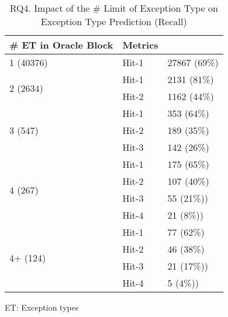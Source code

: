 \begin{table}[t]
	\caption{RQ4. Impact of the \# Limit of Exception Type on Exception Type Prediction (Recall)}
	\tabcolsep 2pt
	{\small
		\begin{center}
			\renewcommand{\arraystretch}{1}
			\begin{tabular}{p{3cm}<{\centering}|p{2cm}<{\centering}|p{2cm}<{\centering}}
				\hline
				\# ET in Oracle Block& Metrics& {\textsc{\tool}\xspace} \\
				\hline
				\multirow{1}{*}{1 (40376)}   & Hit-1  & 27867 (69\%) \\
				\hline
				\multirow{2}{*}{2 (2634)}  & Hit-1   & 2131 (81\%) \\
				& Hit-2         &  1162 (44\%) \\
				\hline
				\multirow{3}{*}{3 (547)}  & Hit-1    & 353 (64\%) \\
				& Hit-2     & 189 (35\%)\\
				& Hit-3     & 142 (26\%) \\
				\hline
				\multirow{4}{*}{4 (267)}  & Hit-1   & 175 (65\%) \\
				& Hit-2     & 107 (40\%) \\
				& Hit-3     & 55 (21\%))\\
				& Hit-4     & 21 (8\%))\\
				\hline
				\multirow{4}{*}{4+ (124)}  & Hit-1   & 77 (62\%) \\
				& Hit-2     & 46 (38\%) \\
				& Hit-3     & 21 (17\%))\\
				& Hit-4     & 5 (4\%))\\
				\hline
			\end{tabular}		
			ET: Exception types
			\label{RQ4_results_4}
		\end{center}
	}
\end{table}

